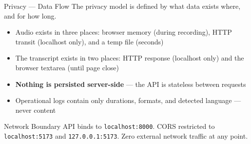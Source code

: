\documentclass{beamer}
\begin{document}
\begin{frame}{Privacy --- Data Flow}
    \small
    The privacy model is defined by what data exists where, and for how long.

    \vspace{0.3em}
    \begin{itemize}\setlength{\itemsep}{2pt}
        \item Audio exists in three places: browser memory (during recording),
              HTTP transit (localhost only), and a temp file (seconds)
        \item The transcript exists in two places: HTTP response (localhost only)
              and the browser textarea (until page close)
        \item \textbf{Nothing is persisted server-side} --- the API is stateless
              between requests
        \item Operational logs contain only durations, formats, and detected
              language --- never content
    \end{itemize}

    \vspace{0.2em}
    \begin{block}{Network Boundary}
        API binds to \texttt{localhost:8000}. CORS restricted to
        \texttt{localhost:5173} and \texttt{127.0.0.1:5173}.
        Zero external network traffic at any point.
    \end{block}
\end{frame}
\end{document}
